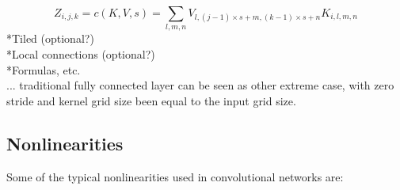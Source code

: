 \documentclass[]{article}
\begin{document}
\[
Z_{i, j, k} = c(K, V, s) =
\sum_{l, m, n} V_{l, (j -1)\times s + m, (k-1)\times s + n} K_{i, l, m, n}
\]
*Tiled (optional?)\\
*Local connections (optional?)\\
*Formulas, etc.\\
... traditional fully connected layer can be seen
as other extreme case, with zero stride and kernel grid size been equal to the
input grid size.

%
%
%
%
%
%
%
%

\subsection{Nonlinearities}
Some of the typical nonlinearities used in convolutional networks are:
\end{document}
